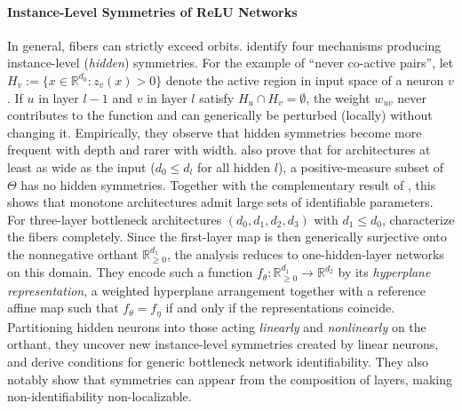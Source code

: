 \documentclass[mathematics,review,submit,moreauthors]{Definitions/mdpi}
\begin{document}
\paragraph{Instance-Level Symmetries of ReLU Networks}
In general, fibers can strictly exceed orbits.
\citet{grigsby2023p4icml} identify four mechanisms producing instance-level (\emph{hidden}) symmetries.
For the example of ``never co-active pairs'', let $H_v:=\{x\in\mathbb{R}^{d_0} : z_v(x)>0\}$ denote the active region in input space of a neuron $v$.
If $u$ in layer $l-1$ and $v$ in layer $l$ satisfy $H_u\cap H_v=\emptyset$, the weight $w_{uv}$ never contributes to the function and can generically be perturbed (locally) without changing it.
Empirically, they observe that hidden symmetries become more frequent with depth and rarer with width.
\citet{grigsby2023p4icml} also prove that for architectures at least as wide as the input ($d_0\le d_l$ for all hidden $l$), a positive-measure subset of $\Theta$ has no hidden symmetries.
Together with the complementary result of \citet{phuong2019}, this shows that monotone architectures admit large sets of identifiable parameters.
For three-layer bottleneck architectures $(d_0,d_1,d_2,d_3)$ with $d_1\le d_0$, \citet{gegenfurtner2026} characterize the fibers completely.
Since the first-layer map is then generically surjective onto the nonnegative orthant $\mathbb{R}^{d_1}_{\ge0}$, the analysis reduces to one-hidden-layer networks on this domain.
They encode such a function $f_\theta: \mathbb R^{d_1}_{\geq 0}\to \mathbb R^{d_2}$ by its \emph{hyperplane representation}, a weighted hyperplane arrangement together with a reference affine map such that $f_\theta=f_\eta$ if and only if the representations coincide.
Partitioning hidden neurons into those acting \emph{linearly} and \emph{nonlinearly} on the orthant, they uncover new instance-level symmetries created by linear neurons, and derive conditions for generic bottleneck network identifiability.
They also notably show that symmetries can appear from the composition of layers, making non-identifiability non-localizable.
\end{document}
